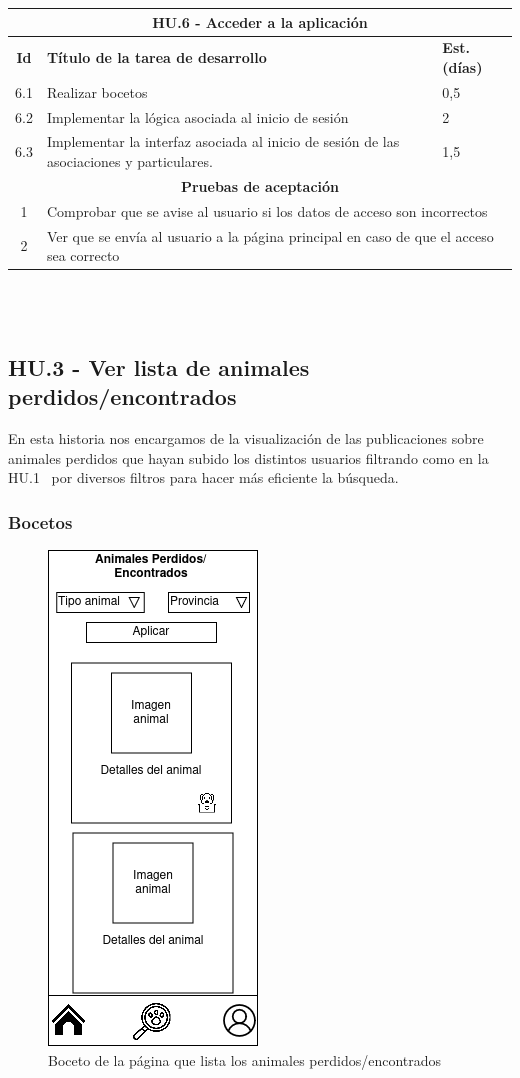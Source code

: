 \begin{tabular}{|c|p{9.5cm}|p{1cm}|}
	\hline
	\multicolumn{3}{|c|}{\textbf{HU.6 - Acceder a la aplicación}} \\
	\hline
	\textbf{Id} & \textbf{Título de la tarea de desarrollo} & \textbf{Est. (días)} \\
	\hline
		6.1 & Realizar bocetos & 0,5 \\ \hline
	6.2 &  Implementar la lógica asociada al inicio de sesión & 2 \\ \hline
	6.3 &  Implementar la interfaz asociada al inicio de sesión de las asociaciones y particulares. & 1,5 \\ \hline
	\multicolumn{3}{|c|}{\textbf{Pruebas de aceptación}} \\ \hline
	1 & \multicolumn{2}{|p{10cm}|}{Comprobar que se avise al usuario si los datos de acceso son incorrectos} \\ \hline
	2 & \multicolumn{2}{|p{10cm}|}{Ver que se envía al usuario a la página principal en caso de que el acceso sea correcto} \\ \hline
	
\end{tabular} \\ \\

\subsection{HU.3 - Ver lista de animales perdidos/encontrados}

En esta historia nos encargamos de la visualización de las publicaciones sobre animales perdidos que hayan subido los distintos usuarios filtrando como en la HU.1~\pageref{sec:hu1} por diversos filtros para hacer más eficiente la búsqueda.

\subsubsection{Bocetos}

\begin{figure}[H]
	\centering
	\includegraphics[width=0.31\linewidth]{"sprint 2/hu3/listaPerdidos"}
	\caption{Boceto de la página que lista los animales perdidos/encontrados}
	\label{fig:listaperdidos}
\end{figure}

